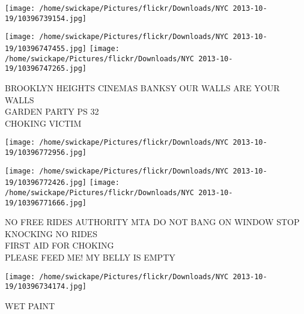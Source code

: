 \documentclass[10pt,letterpaper]{article}
\begin{document}
\texttt{[image: /home/swickape/Pictures/flickr/Downloads/NYC 2013-10-19/10396739154.jpg]}

\vspace{0.25in}
\texttt{[image: /home/swickape/Pictures/flickr/Downloads/NYC 2013-10-19/10396747455.jpg]}
\texttt{[image: /home/swickape/Pictures/flickr/Downloads/NYC 2013-10-19/10396747265.jpg]}

BROOKLYN HEIGHTS CINEMAS BANKSY OUR WALLS ARE YOUR WALLS\\
GARDEN PARTY PS 32\\
CHOKING VICTIM\\
\pagebreak

\texttt{[image: /home/swickape/Pictures/flickr/Downloads/NYC 2013-10-19/10396772956.jpg]}

\vspace{0.25in}
\texttt{[image: /home/swickape/Pictures/flickr/Downloads/NYC 2013-10-19/10396772426.jpg]}
\texttt{[image: /home/swickape/Pictures/flickr/Downloads/NYC 2013-10-19/10396771666.jpg]}

NO FREE RIDES AUTHORITY MTA DO NOT BANG ON WINDOW STOP KNOCKING NO RIDES\\
FIRST AID FOR CHOKING\\
PLEASE FEED ME! MY BELLY IS EMPTY\\
\pagebreak

\texttt{[image: /home/swickape/Pictures/flickr/Downloads/NYC 2013-10-19/10396734174.jpg]}

WET PAINT\\
\pagebreak
\end{document}
